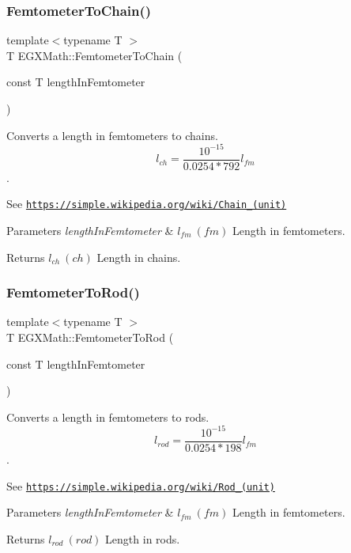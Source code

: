 \subsubsection{\texorpdfstring{Femtometer\+To\+Chain()}{FemtometerToChain()}}
{\footnotesize\ttfamily template$<$typename T $>$ \\
T E\+G\+X\+Math\+::\+Femtometer\+To\+Chain (\begin{DoxyParamCaption}\item[{const T}]{length\+In\+Femtometer }\end{DoxyParamCaption})}



Converts a length in femtometers to chains. \[ l_{ch}= \frac{10^{-15}}{0.0254 * 792} l_{fm} \]. 

See \href{https://simple.wikipedia.org/wiki/Chain_(unit)}{\tt https\+://simple.\+wikipedia.\+org/wiki/\+Chain\+\_\+(unit)} 
\begin{DoxyParams}{Parameters}
{\em length\+In\+Femtometer} & $ l_{fm}\ (fm)$ Length in femtometers. \\
\hline
\end{DoxyParams}
\begin{DoxyReturn}{Returns}
$ l_{ch}\ (ch)$ Length in chains. 
\end{DoxyReturn}
\mbox{\label{group___e_g_x_math-_conversions-_length_conversions-_s_i-_femtometer-_surveyors_ga29f133c21de5eca2aa12f88caf6da86f}} 
\subsubsection{\texorpdfstring{Femtometer\+To\+Rod()}{FemtometerToRod()}}
{\footnotesize\ttfamily template$<$typename T $>$ \\
T E\+G\+X\+Math\+::\+Femtometer\+To\+Rod (\begin{DoxyParamCaption}\item[{const T}]{length\+In\+Femtometer }\end{DoxyParamCaption})}



Converts a length in femtometers to rods. \[ l_{rod}= \frac{10^{-15}}{0.0254 * 198} l_{fm} \]. 

See \href{https://simple.wikipedia.org/wiki/Rod_(unit)}{\tt https\+://simple.\+wikipedia.\+org/wiki/\+Rod\+\_\+(unit)} 
\begin{DoxyParams}{Parameters}
{\em length\+In\+Femtometer} & $ l_{fm}\ (fm)$ Length in femtometers. \\
\hline
\end{DoxyParams}
\begin{DoxyReturn}{Returns}
$ l_{rod}\ (rod)$ Length in rods. 
\end{DoxyReturn}
